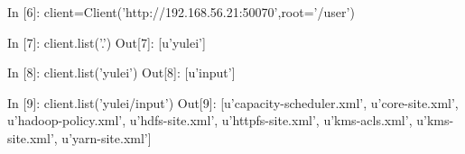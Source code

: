 
In [6]: client=Client('http://192.168.56.21:50070',root='/user')     

In [7]: client.list('.')
Out[7]: [u'yulei']

In [8]: client.list('yulei')
Out[8]: [u'input']

In [9]: client.list('yulei/input')
Out[9]: 
[u'capacity-scheduler.xml',
 u'core-site.xml',
 u'hadoop-policy.xml',
 u'hdfs-site.xml',
 u'httpfs-site.xml',
 u'kms-acls.xml',
 u'kms-site.xml',
 u'yarn-site.xml']
